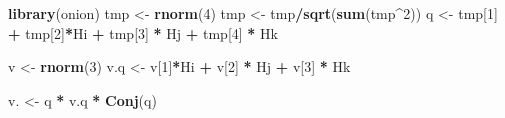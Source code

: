 \documentclass[]{article}
\newenvironment{Shaded}{\begin{snugshade}}{\end{snugshade}}
\newcommand{\KeywordTok}[1]{\textcolor[rgb]{0.13,0.29,0.53}{\textbf{#1}}}
\newcommand{\DecValTok}[1]{\textcolor[rgb]{0.00,0.00,0.81}{#1}}
\newcommand{\StringTok}[1]{\textcolor[rgb]{0.31,0.60,0.02}{#1}}
\newcommand{\OperatorTok}[1]{\textcolor[rgb]{0.81,0.36,0.00}{\textbf{#1}}}
\newcommand{\NormalTok}[1]{#1}
\begin{document}
\begin{Shaded}
\begin{Highlighting}[]
\KeywordTok{library}\NormalTok{(onion)}
\NormalTok{tmp <-}\StringTok{ }\KeywordTok{rnorm}\NormalTok{(}\DecValTok{4}\NormalTok{)}
\NormalTok{tmp <-}\StringTok{ }\NormalTok{tmp}\OperatorTok{/}\KeywordTok{sqrt}\NormalTok{(}\KeywordTok{sum}\NormalTok{(tmp}\OperatorTok{^}\DecValTok{2}\NormalTok{))}
\NormalTok{q <-}\StringTok{ }\NormalTok{tmp[}\DecValTok{1}\NormalTok{] }\OperatorTok{+}\StringTok{ }\NormalTok{tmp[}\DecValTok{2}\NormalTok{]}\OperatorTok{*}\NormalTok{Hi }\OperatorTok{+}\StringTok{ }\NormalTok{tmp[}\DecValTok{3}\NormalTok{] }\OperatorTok{*}\StringTok{ }\NormalTok{Hj }\OperatorTok{+}\StringTok{ }\NormalTok{tmp[}\DecValTok{4}\NormalTok{] }\OperatorTok{*}\StringTok{ }\NormalTok{Hk}

\NormalTok{v <-}\StringTok{ }\KeywordTok{rnorm}\NormalTok{(}\DecValTok{3}\NormalTok{)}
\NormalTok{v.q <-}\StringTok{ }\NormalTok{v[}\DecValTok{1}\NormalTok{]}\OperatorTok{*}\NormalTok{Hi }\OperatorTok{+}\StringTok{ }\NormalTok{v[}\DecValTok{2}\NormalTok{] }\OperatorTok{*}\StringTok{ }\NormalTok{Hj }\OperatorTok{+}\StringTok{ }\NormalTok{v[}\DecValTok{3}\NormalTok{] }\OperatorTok{*}\StringTok{ }\NormalTok{Hk}

\NormalTok{v. <-}\StringTok{ }\NormalTok{q }\OperatorTok{*}\StringTok{ }\NormalTok{v.q }\OperatorTok{*}\StringTok{ }\KeywordTok{Conj}\NormalTok{(q)}




\end{Highlighting}
\end{Shaded}
\end{document}
